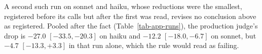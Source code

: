 A second such run on sonnet and haiku, whose reductions were the smallest,
registered before its calls but after the first was read, revises no
conclusion above as registered.
Pooled after the fact (Table~\ref{tab-app-runs}), the production judge's
drop is $-27.0$ $[-33.5, -20.3]$ on haiku and $-12.2$
$[-18.0, -6.7]$ on sonnet, but $-4.7$ $[-13.3, +3.3]$ in that run
alone, which the rule would read as failing.
